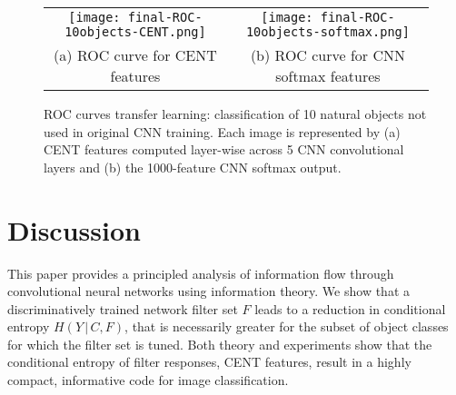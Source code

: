 \documentclass[10pt,onecolumn]{article}
\begin{document}
\begin{figure}[t]
\begin{center}
\begin{tabular}{cc}
\texttt{[image: final-ROC-10objects-CENT.png]} & 
\texttt{[image: final-ROC-10objects-softmax.png]} \\
(a) ROC curve for CENT features &
(b) ROC curve for CNN softmax features
\end{tabular}
\end{center}
   \caption{ROC curves transfer learning: classification of 10 natural objects not used in original CNN training. Each image is represented by (a) CENT features computed layer-wise across 5 CNN convolutional layers and (b) the 1000-feature CNN softmax output.}
\label{fig:objects_cent_vs_cnn_softmax}
\end{figure}


\section{Discussion}

This paper provides a principled analysis of information flow through convolutional neural networks using information theory. We show that a discriminatively trained network filter set $F$ leads to a reduction in conditional entropy $H(Y\, | \,C,F)$, that is necessarily greater for the subset of object classes for which the filter set is tuned. Both theory and experiments show that the conditional entropy of filter responses, CENT features, result in a highly compact, informative code for image classification.
\end{document}
